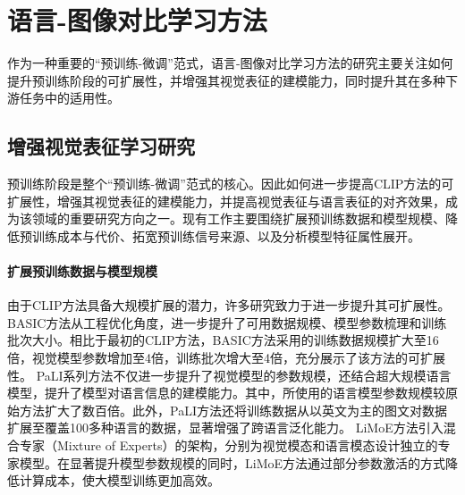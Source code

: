 
\section{语言-图像对比学习方法}
作为一种重要的“预训练-微调”范式，语言-图像对比学习方法的研究主要关注如何提升预训练阶段的可扩展性，并增强其视觉表征的建模能力，同时提升其在多种下游任务中的适用性。

\subsection{增强视觉表征学习研究}
预训练阶段是整个“预训练-微调”范式的核心。因此如何进一步提高CLIP方法的可扩展性，增强其视觉表征的建模能力，并提高视觉表征与语言表征的对齐效果，成为该领域的重要研究方向之一。现有工作主要围绕扩展预训练数据和模型规模、降低预训练成本与代价、拓宽预训练信号来源、以及分析模型特征属性展开。

\paragraph{扩展预训练数据与模型规模} 由于CLIP方法具备大规模扩展的潜力，许多研究致力于进一步提升其可扩展性。
BASIC方法\cite{pham2023combined}从工程优化角度，进一步提升了可用数据规模、模型参数梳理和训练批次大小。相比于最初的CLIP方法\cite{radford2021learning}，BASIC方法采用的训练数据规模扩大至16倍，视觉模型参数增加至4倍，训练批次增大至4倍，充分展示了该方法的可扩展性。
PaLI系列方法\cite{pali,palix}不仅进一步提升了视觉模型的参数规模，还结合超大规模语言模型，提升了模型对语言信息的建模能力。其中，所使用的语言模型参数规模较原始方法扩大了数百倍。此外，PaLI方法还将训练数据从以英文为主的图文对数据扩展至覆盖100多种语言的数据，显著增强了跨语言泛化能力。
LiMoE方法\cite{LiMoE}引入混合专家（Mixture of Experts）\cite{gshard}的架构，分别为视觉模态和语言模态设计独立的专家模型。在显著提升模型参数规模的同时，LiMoE方法通过部分参数激活的方式降低计算成本，使大模型训练更加高效。

